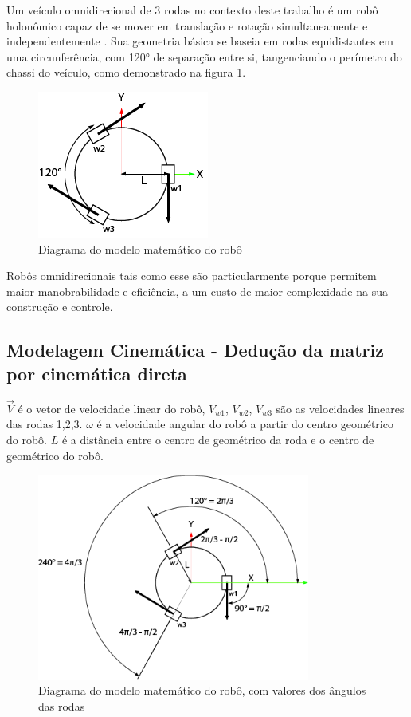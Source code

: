 
Um veículo omnidirecional de 3 rodas no contexto deste trabalho é um robô
holonômico capaz de se mover em translação e rotação simultaneamente e
independentemente \cite{mobile_manipulator_robot}. Sua geometria básica se 
baseia em rodas equidistantes em uma circunferência, com 120° de separação entre
 si, tangenciando o perímetro do chassi do veículo, como demonstrado na figura
 1.

\begin{figure}[h]
	\centering
	\includegraphics{figures/model}
	\caption{Diagrama do modelo matemático do robô}
\end{figure}

Robôs omnidirecionais tais como esse são particularmente porque permitem maior
 manobrabilidade e eficiência, a um custo de maior complexidade na sua
 construção e controle. \cite{dynamical_models_for_omni_directional_robots}

\subsection{Modelagem Cinemática - Dedução da matriz por cinemática direta}

$\overrightarrow{V}$ é o vetor de velocidade linear do robô, $V_{w1}$, $V_{w2}$,
$V_{w3}$ são as velocidades lineares das rodas 1,2,3. 
$\omega $ é a velocidade angular do robô a partir do centro geométrico do robô.
$L$ é a distância entre o centro de geométrico da roda e o centro de geométrico
do robô.


\begin{figure}[h]
	\centering
	\includegraphics[width=0.8\textwidth]{figures/digram_model_dedution}
	\caption{Diagrama do modelo matemático do robô, com valores dos ângulos das rodas}
\end{figure}

